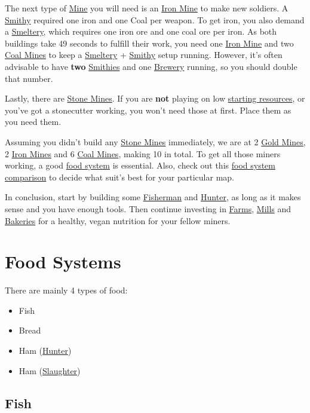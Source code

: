 \documentclass[11pt]{article}
\begin{document}
The next type of \hyperref[mine]{Mine} you will need is an \hyperref[ironmine]{Iron Mine} to make new soldiers. A \hyperref[smithy]{Smithy} required one iron and one Coal per weapon. To get iron, you also demand a \hyperref[smeltery]{Smeltery}, which requires one iron ore and one coal ore per iron. As both buildings take 49 seconds to fulfill their work, you need one \hyperref[ironmine]{Iron Mine} and two \hyperref[coalmine]{Coal Mines} to keep a \hyperref[smeltery]{Smeltery} + \hyperref[smithy]{Smithy} setup running. However, it's often advisable to have \textbf{two} \hyperref[smithy]{Smithies} and one \hyperref[brewery]{Brewery} running, so you should double that number.

Lastly, there are \hyperref[stonemine]{Stone Mines}. If you are \textbf{not} playing on low \hyperref[startresources]{starting resources}, or you've got a stonecutter working, you won't need those at first. Place them as you need them.

Assuming you didn't build any \hyperref[stonemine]{Stone Mines} immediately, we are at 2 \hyperref[goldmine]{Gold Mines}, 2 \hyperref[ironmine]{Iron Mines} and 6 \hyperref[coalmine]{Coal Mines}, making 10 in total. To get all those miners working, a good \hyperref[foodsystems]{food system} is essential. Also, check out this \hyperref[foodsystemcomparison]{food system comparison} to decide what suit's best for your particular map.

In conclusion, start by building some \hyperref[fisherman]{Fisherman} and \hyperref[hunter]{Hunter}, as long as it makes sense and you have enough tools.
Then continue investing in \hyperref[farm]{Farms}, \hyperref[mill]{Mills} and \hyperref[bakery]{Bakeries} for a healthy, vegan nutrition for your fellow miners.

\section{Food Systems}
\label{sec:foodsystems}

There are mainly 4 types of food:

\begin{itemize}
  \item Fish
  \item Bread
  \item Ham (\hyperref[hunter]{Hunter})
  \item Ham (\hyperref[slaughterhouse]{Slaughter})
\end{itemize}

\subsection{Fish}
\label{sec:fish}
\end{document}
